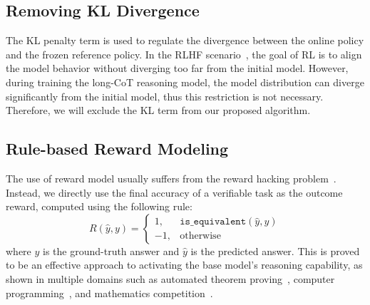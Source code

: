 \subsection{Removing KL Divergence}
\label{sec:removekl}
The KL penalty term is used to regulate the
divergence between the online policy and the frozen reference policy. 
In the RLHF scenario~\cite{NEURIPS2022_b1efde53}, the goal of RL is to align the model behavior without diverging too far from the initial model.
However, during training the long-CoT reasoning model, the model distribution can diverge significantly from the initial model, thus this restriction is not necessary. Therefore, we will exclude the KL term from our proposed algorithm.

\subsection{Rule-based Reward Modeling}
The use of reward model usually suffers from the reward hacking problem~\cite{amodei2016concreteproblemsaisafety,
everitt2017reinforcementlearningcorruptedreward,
google2020specialgaming,
everitt2021rewardtamperingproblemssolutions,
gao2022scalinglawsrewardmodel,weng2024rewardhack}.
Instead, we directly use the final accuracy of a verifiable task as the outcome reward, computed using the following rule:
\begin{equation}
    R(\hat{y}, y) = 
    \begin{cases} 
    1, & \texttt{is\_equivalent}(\hat{y}, y) \\
    -1, & \text{otherwise} 
    \end{cases}
\end{equation}
where $y$ is the ground-truth answer and $\hat{y}$ is the predicted answer.
This is proved to be an effective approach to activating the base model's reasoning capability, as shown in multiple domains such as automated theorem proving~\cite{polu2020generativelanguagemodelingautomated,trinh2024solving,google2024alphageometry,google2024alphaproofandalphageometry}, computer programming~\cite{le2022coderl,shinn2023reflexionlanguageagentsverbal,chen2023teachinglargelanguagemodels,gehring2025rlefgroundingcodellms}, and mathematics competition~\cite{guo2025deepseek}.

